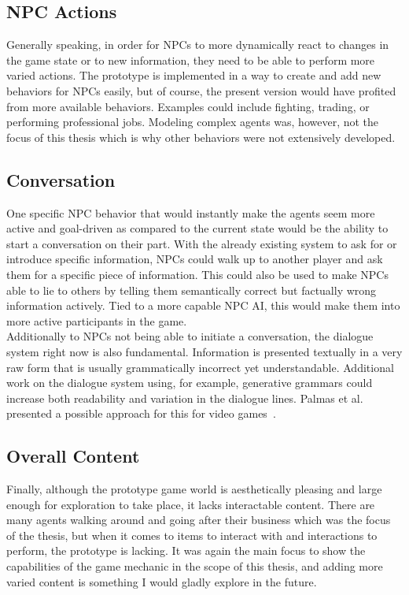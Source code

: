 \subsection{NPC Actions}
Generally speaking, in order for NPCs to more dynamically react to changes in the game state or to new information, they need to be able to perform more varied actions. The prototype is implemented in a way to create and add new behaviors for NPCs easily, but of course, the present version would have profited from more available behaviors. Examples could include fighting, trading, or performing professional jobs. Modeling complex agents was, however, not the focus of this thesis which is why other behaviors were not extensively developed.
\subsection{Conversation}
One specific NPC behavior that would instantly make the agents seem more active and goal-driven as compared to the current state would be the ability to start a conversation on their part. With the already existing system to ask for or introduce specific information, NPCs could walk up to another player and ask them for a specific piece of information. This could also be used to make NPCs able to lie to others by telling them semantically correct but factually wrong information actively. Tied to a more capable NPC AI, this would make them into more active participants in the game.\\
Additionally to NPCs not being able to initiate a conversation, the dialogue system right now is also fundamental. Information is presented textually in a very raw form that is usually grammatically incorrect yet understandable. Additional work on the dialogue system using, for example, generative grammars could increase both readability and variation in the dialogue lines. Palmas et al. presented a possible approach for this for video games~\cite{Palmas2020}.
\subsection{Overall Content}
Finally, although the prototype game world is aesthetically pleasing and large enough for exploration to take place, it lacks interactable content. There are many agents walking around and going after their business which was the focus of the thesis, but when it comes to items to interact with and interactions to perform, the prototype is lacking. It was again the main focus to show the capabilities of the game mechanic in the scope of this thesis, and adding more varied content is something I would gladly explore in the future.
